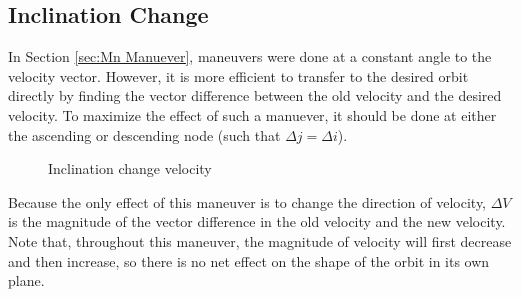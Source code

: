 \documentclass[../main.tex]{subfiles}
\begin{document}
\bigskip\bigskip
\subsection{Inclination Change}

In Section \ref{sec:Mn Manuever}, maneuvers were done at a constant angle to the velocity vector. However, it is more efficient to transfer to the desired orbit directly by finding the vector difference between the old velocity and the desired velocity. To maximize the effect of such a manuever, it should be done at either the ascending or descending node (such that $\Delta j=\Delta i$).

\begin{figure}[H]
    \centering
    \caption{Inclination change velocity}\label{fig:dV Triangle Inclination Chage}
\end{figure}

Because the only effect of this maneuver is to change the direction of velocity, $\Delta V$ is the magnitude of the vector difference in the old velocity and the new velocity. Note that, throughout this maneuver, the magnitude of velocity will first decrease and then increase, so there is no net effect on the shape of the orbit in its own plane.
\end{document}
